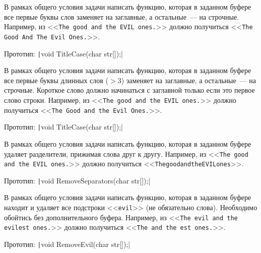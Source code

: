 \begin{zztask}
В рамках общего условия задачи написать функцию, которая в заданном буфере
все первые буквы слов заменяет на заглавные, а остальные~--- на строчные.
Например, из
<<\texttt{The good and the EVIL ones.}>>
должно получиться
<<\texttt{The Good And The Evil Ones.}>>.

Прототип: \texttt|void TitleCase(char str[]);|
\end{zztask}


\begin{zztask}[Заголовок]
В рамках общего условия задачи написать функцию, которая в заданном буфере
все первые буквы длинных слов ($>3$) заменяет на заглавные, а остальные~--- на
строчные. Короткое слово должно начинаться с заглавной только если это первое
слово строки.
Например, из
<<\texttt{The good and the EVIL ones.}>>
должно получиться
<<\texttt{The Good and the Evil Ones.}>>.

Прототип: \texttt|void TitleCase(char str[]);|
\end{zztask}


\begin{zztask}
В рамках общего условия задачи написать функцию, которая в заданном буфере
удаляет разделители, прижимая слова друг к другу.
Например, из
<<\texttt{The good and the EVIL ones.}>>
должно получиться\linebreak
<<\texttt{ThegoodandtheEVILones}>>.

Прототип: \texttt|void RemoveSeparators(char str[]);|
\end{zztask}


\begin{zztask}
В рамках общего условия задачи написать функцию, которая в заданном буфере
находит и удаляет все подстроки <<\texttt{evil}>> (не обязательно слова).
Необходимо обойтись без дополнительного буфера.
Например, из
<<\texttt{The evil and the evilest ones.}>>
должно получиться
<<\texttt{The  and the est ones.}>>.

Прототип: \texttt|void RemoveEvil(char str[]);|
\end{zztask}

